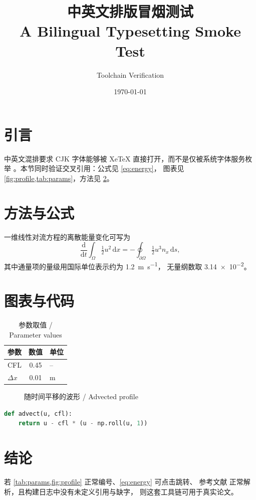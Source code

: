 \documentclass[UTF8,fontset=none,11pt]{ctexart}
\title{中英文排版冒烟测试\\[2pt]\large A Bilingual Typesetting Smoke Test}
\author{Toolchain Verification}
\date{\today}
\begin{document}
\maketitle

\section{引言}\label{sec:intro}
中英文混排要求 CJK 字体能够被 XeTeX 直接打开，而不是仅被系统字体服务枚举
\cite{knuth1984,lamport1994}。本节同时验证交叉引用：公式见 \cref{eq:energy}，
图表见 \cref{fig:profile,tab:params}，方法见 \cref{sec:method}。

\section{方法与公式}\label{sec:method}
一维线性对流方程的离散能量变化可写为
\begin{equation}\label{eq:energy}
  \frac{\mathrm{d}}{\mathrm{d}t}\int_{\Omega} \tfrac{1}{2} u^{2}\,\mathrm{d}x
  = -\oint_{\partial\Omega} \tfrac{1}{2} u^{3} n_{x}\,\mathrm{d}s ,
\end{equation}
其中通量项的量级用国际单位表示约为 \qty{1.2}{\metre\per\second}，
无量纲数取 \num{3.14e-2}。

\section{图表与代码}\label{sec:results}
\begin{table}[htbp]
  \centering
  \caption{参数取值 / Parameter values}\label{tab:params}
  \begin{tabular}{lS[table-format=2.2]l}
    \toprule
    参数 & {数值} & 单位 \\
    \midrule
    CFL  & 0.45 & -- \\
    $\Delta x$ & 0.01 & \si{\metre} \\
    \bottomrule
  \end{tabular}
\end{table}

\begin{figure}[htbp]
  \centering
  \caption{随时间平移的波形 / Advected profile}\label{fig:profile}
\end{figure}

\begin{lstlisting}[language=Python,caption={最小示例}]
def advect(u, cfl):
    return u - cfl * (u - np.roll(u, 1))
\end{lstlisting}

\section{结论}
若 \cref{tab:params,fig:profile} 正常编号、\cref{eq:energy} 可点击跳转、
参考文献 \cite{knuth1984,lamport1994} 正常解析，且构建日志中没有未定义引用与缺字，
则这套工具链可用于真实论文。

\printbibliography
\end{document}
